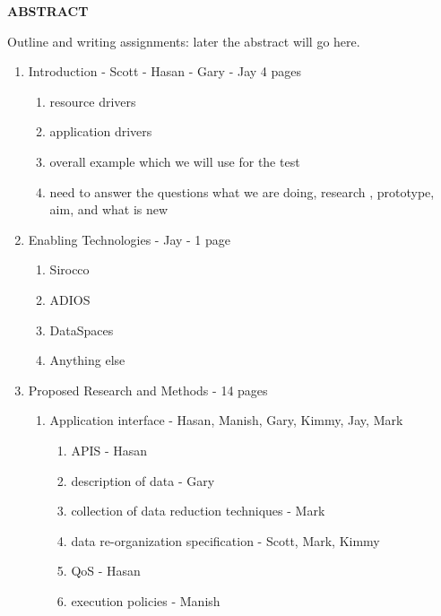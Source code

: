 \vspace{-\belowdisplayskip}
\vspace{-\abovedisplayskip}
\medskip

\begin{center}
\textbf{ABSTRACT}
\end{center}

\vspace{-\belowdisplayskip}

\enlargethispage{2\baselineskip}

\noindent
Outline and writing assignments:
later the abstract will go here.
\begin{enumerate}
\item Introduction - Scott - Hasan - Gary - Jay 4 pages
   \begin{enumerate}
      \item resource drivers
      \item application drivers
      \item overall example which we will use for the test
      \item  need to answer the questions what we are doing, research  , prototype, aim, and what is new
   \end{enumerate}
\item Enabling Technologies - Jay - 1 page
   \begin{enumerate}
   	\item Sirocco
   	\item ADIOS
   	\item DataSpaces
   	\item Anything else
   \end{enumerate}
 \item {Proposed Research and Methods} - 14 pages
    \begin{enumerate}
       \item Application interface - Hasan, Manish, Gary, Kimmy, Jay, Mark
          \begin{enumerate}
            \item APIS - Hasan
            \item description of data - Gary
            \item collection of data reduction techniques - Mark
            \item data re-organization specification - Scott, Mark, Kimmy
            \item QoS - Hasan
            \item execution policies - Manish

\end{enumerate}
\end{enumerate}
\end{enumerate}
